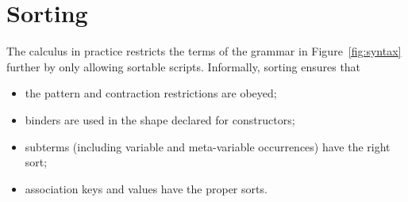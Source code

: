 \documentclass[letterpaper,11pt]{article}
\begin{document}

\section{Sorting}
\label{sec:sorting}

The \hax calculus in practice restricts the terms of the grammar in Figure~\ref{fig:syntax} further
by only allowing sortable scripts. Informally, sorting ensures that
\begin{itemize}
\item the pattern and contraction restrictions are obeyed;
\item binders are used in the shape declared for constructors;
\item subterms (including variable and meta-variable occurrences) have the right sort;
\item association keys and values have the proper sorts.
\end{itemize}
\end{document}
